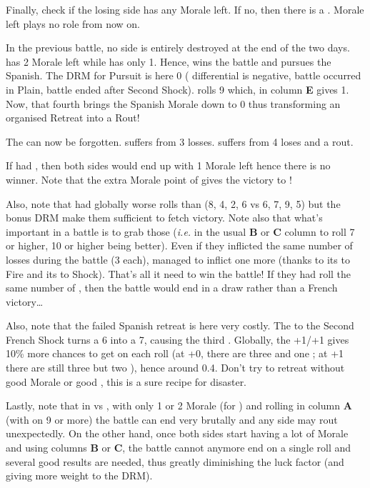 Finally, check if the losing side has any Morale left. If no, then there is a
. Morale left plays no role from now on.

\begin{exemple}[Pursuit]
  In the previous battle, no side is entirely destroyed at the end of the two
  days. \FRA has 2 Morale left while \HIS has only 1. Hence, \FRA wins the
  battle and pursues the Spanish. The DRM for Pursuit is here 0 (\Shock
  differential is negative, battle occurred in Plain, battle ended after
  Second Shock). \FRA rolls 9 which, in column \textbf{E} gives
  1\textetoile. Now, that fourth \textetoile brings the Spanish Morale down to
  0 thus transforming an organised Retreat into a Rout!

  The \textetoile can now be forgotten. \FRA suffers from 3 losses. \HIS
  suffers from 4 loses and a rout.

  \smallskip

  If \FRA had , then both sides would end up with 1 Morale
  left hence there is no winner. Note that the extra Morale point of
   gives the victory to \FRA!

  \smallskip

  Also, note that \FRA had globally worse rolls than \HIS (8, 4, 2, 6 vs 6, 7,
  9, 5) but the bonus DRM make them sufficient to fetch victory. Note also
  that what's important in a battle is to grab those \textetoile (\emph{i.e.}
  in the usual \textbf{B} or \textbf{C} column to roll 7 or higher, 10 or
  higher being better). Even if they inflicted the same number of losses
  during the battle (3 each), \FRA managed to inflict one more \textetoile
  (thanks to its  to Fire and its  to Shock). That's all
  it need to win the battle! If they had roll the same number of \textetoile,
  then the battle would end in a draw rather than a French victory\ldots

  Also, note that the failed Spanish retreat is here very costly. The
   to the Second French Shock turns a 6 into a 7, causing the third
  \textetoile. Globally, the +1/+1 gives 10\% more chances to get
  \textetoile\textetoile on each roll (at +0, there are three \textetoile and
  one \textetoile\textetoile; at +1 there are still three \textetoile but two
  \textetoile\textetoile), hence around 0.4\textetoile. Don't try to retreat
  without good Morale or good \Man, this is a sure recipe for disaster.

  Lastly, note that in \TMED vs \TMED, with only 1 or 2 Morale (for
  ) and rolling in column \textbf{A} (with
  \textetoile\textetoile on 9 or more) the battle can end very brutally and
  any side may rout unexpectedly. On the other hand, once both sides start
  having a lot of Morale and using columns \textbf{B} or \textbf{C}, the
  battle cannot anymore end on a single roll and several good results are
  needed, thus greatly diminishing the luck factor (and giving more weight to
  the DRM).
\end{exemple}

